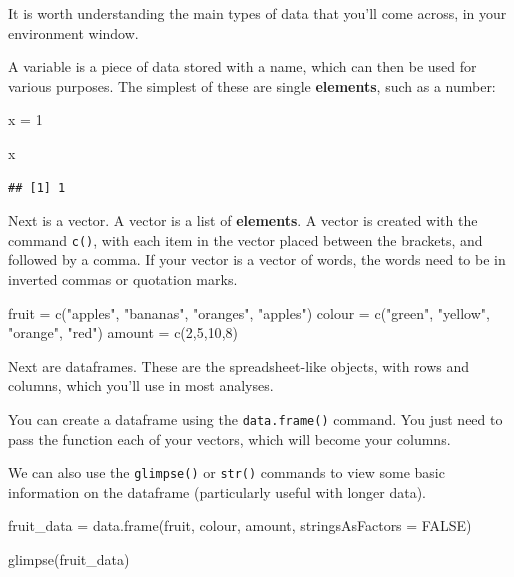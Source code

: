 \documentclass[
]{book}
\newenvironment{Shaded}{\begin{snugshade}}{\end{snugshade}}
\newcommand{\AttributeTok}[1]{\textcolor[rgb]{0.77,0.63,0.00}{#1}}
\newcommand{\ConstantTok}[1]{\textcolor[rgb]{0.00,0.00,0.00}{#1}}
\newcommand{\DecValTok}[1]{\textcolor[rgb]{0.00,0.00,0.81}{#1}}
\newcommand{\FunctionTok}[1]{\textcolor[rgb]{0.00,0.00,0.00}{#1}}
\newcommand{\NormalTok}[1]{#1}
\newcommand{\OtherTok}[1]{\textcolor[rgb]{0.56,0.35,0.01}{#1}}
\newcommand{\StringTok}[1]{\textcolor[rgb]{0.31,0.60,0.02}{#1}}
\begin{document}
It is worth understanding the main types of data that you'll come across, in your environment window.

A variable is a piece of data stored with a name, which can then be used for various purposes. The simplest of these are single \textbf{elements}, such as a number:

\begin{Shaded}
\begin{Highlighting}[]
\NormalTok{x }\OtherTok{=} \DecValTok{1}

\NormalTok{x}
\end{Highlighting}
\end{Shaded}

\begin{verbatim}
## [1] 1
\end{verbatim}

Next is a vector. A vector is a list of \textbf{elements}. A vector is created with the command \texttt{c()}, with each item in the vector placed between the brackets, and followed by a comma. If your vector is a vector of words, the words need to be in inverted commas or quotation marks.

\begin{Shaded}
\begin{Highlighting}[]
\NormalTok{fruit }\OtherTok{=} \FunctionTok{c}\NormalTok{(}\StringTok{"apples"}\NormalTok{, }\StringTok{"bananas"}\NormalTok{, }\StringTok{"oranges"}\NormalTok{, }\StringTok{"apples"}\NormalTok{)}
\NormalTok{colour }\OtherTok{=} \FunctionTok{c}\NormalTok{(}\StringTok{"green"}\NormalTok{, }\StringTok{"yellow"}\NormalTok{, }\StringTok{"orange"}\NormalTok{, }\StringTok{"red"}\NormalTok{)}
\NormalTok{amount }\OtherTok{=} \FunctionTok{c}\NormalTok{(}\DecValTok{2}\NormalTok{,}\DecValTok{5}\NormalTok{,}\DecValTok{10}\NormalTok{,}\DecValTok{8}\NormalTok{)}
\end{Highlighting}
\end{Shaded}

Next are dataframes. These are the spreadsheet-like objects, with rows and columns, which you'll use in most analyses.

You can create a dataframe using the \texttt{data.frame()} command. You just need to pass the function each of your vectors, which will become your columns.

We can also use the \texttt{glimpse()} or \texttt{str()} commands to view some basic information on the dataframe (particularly useful with longer data).

\begin{Shaded}
\begin{Highlighting}[]
\NormalTok{fruit\_data }\OtherTok{=} \FunctionTok{data.frame}\NormalTok{(fruit, colour, amount, }\AttributeTok{stringsAsFactors =} \ConstantTok{FALSE}\NormalTok{)}

\FunctionTok{glimpse}\NormalTok{(fruit\_data)}
\end{Highlighting}
\end{Shaded}
\end{document}
